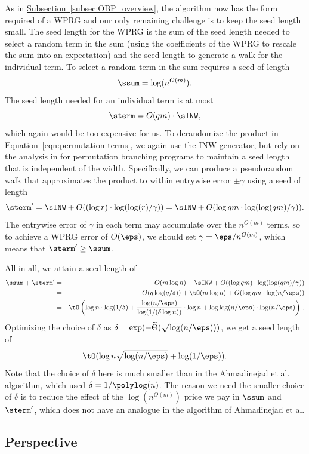 \documentclass[11pt]{article}
\newcommand{\expref}[2]{\texorpdfstring{\hyperref[#2]{#1~\ref{#2}}}{#1~\ref{#2}}}
\newcommand{\expeqref}[2]{\texorpdfstring{\hyperref[#2]{#1~\eqref{#2}}}{#1~\eqref{#2}}}
\begin{document}
    As in \expref{Subsection}{subsec:OBP_overview}, the algorithm now has the form required of a WPRG and our only remaining challenge is to keep the seed length small. 
    The seed length
    for the WPRG is the sum of the seed length needed to select a random term in the sum (using the coefficients of the WPRG to rescale the sum into an expectation) and the seed length to generate a walk for the individual term.
    To select a random term in the sum requires a seed of length
    $$\ssum = \log (n^{O(m)}).$$
    The seed length needed for an individual term is at most $$\sterm = O(qm)\cdot \sINW,$$
    which again would be too expensive for us.
    To derandomize the product in \expeqref{Equation}{eqn:permutation-terms}, 
    we again use the INW generator, but
    rely on the analysis in \cite{HozaPyVa21} for permutation branching
    programs to maintain a seed length that is independent of the width.  Specifically, we can produce a pseudorandom walk that approximates the product to within entrywise error $\pm \gamma$ using a seed of length 
    $$\sterm' = \sINW+O((\log r)\cdot \log(\log(r)/\gamma))
    = \sINW + O(\log qm\cdot \log(\log(qm)/\gamma)).$$
    The entrywise error of $\gamma$ in each term may accumulate over the $n^{O(m)}$ terms, so to achieve a WPRG error of $O(\eps)$, we should set $\gamma=\eps/n^{O(m)}$, which means that $\sterm' \geq \ssum$.  
    
    All in all, we attain a seed length of
    \begin{eqnarray*}
    \ssum+\sterm' 
    &=& O(m\log n)+\sINW+O((\log qm)\cdot \log(\log(qm)/\gamma))\\
    &=& O(q\log(q/\delta)) + \tO(m\log n) + O(\log qm\cdot \log(n/\eps))\\
    &=& \tO\left(\log n\cdot \log(1/\delta) + \frac{\log(n/\eps)}{\log(1/(\delta\log n))}\cdot \log n + \log\log(n/\eps)\cdot \log(n/\eps)\right)\,.
    \end{eqnarray*}
    Optimizing the choice of $\delta$ as $\delta = \exp(-\widetilde{\Theta}(\sqrt{\log(n/\eps)}))$, we get a seed length of
    $$\tO(\log n\sqrt{\log(n/\eps)} + \log(1/\eps)).$$
    Note that the choice of $\delta$ here is much smaller than in 
    the %
Ahmadinejad  %
et al. algorithm, which used $\delta=1/\polylog(n)$.
    The reason we need the smaller choice of $\delta$ is to reduce the effect of the $\log(n^{O(m)})$ price we pay in $\ssum$ and $\sterm'$, which does not have an analogue in the algorithm of
%
Ahmadinejad  %
et al.
    
\subsection{Perspective}
\end{document}
